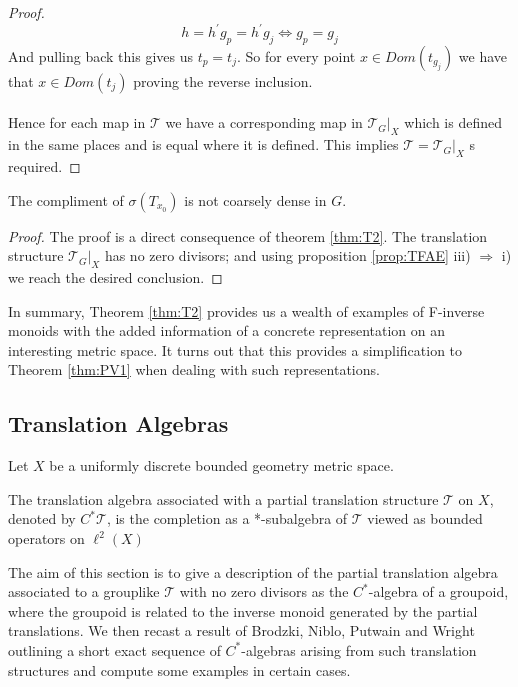 \begin{corollary}
\begin{proof}
\begin{equation}
h=h^{'}g_{p}=h^{'}g_{j} \Leftrightarrow g_{p}=g_{j}
\end{equation}
And pulling back this gives us $t_{p}=t_{j}$. So for every point $x\in Dom(t_{g_{j}})$ we have that $x \in Dom(t_{j})$ proving the reverse inclusion.\\
\\
Hence for each map in $\mathcal{T}$ we have a corresponding map in $\mathcal{T}_{G}|_{X}$ which is defined in the same places and is equal where it is defined. This implies $\mathcal{T}=\mathcal{T}_{G}|_{X}$ s required.
\end{proof}

\begin{corollary}
The compliment of $\sigma (T_{x_{0}})$ is not coarsely dense in $G$.
\end{corollary}
\begin{proof} 
The proof is a direct consequence of theorem \ref{thm:T2}. The translation structure $\mathcal{T}_{G}|_{X}$ has no zero divisors; and using proposition \ref{prop:TFAE} iii) $\Rightarrow$ i) we reach the desired conclusion.
\end{proof}

In summary, Theorem \ref{thm:T2} provides us a wealth of examples of F-inverse monoids with the added information of a concrete representation on an interesting metric space. It turns out that this provides a simplification to Theorem \ref{thm:PV1} when dealing with such representations.

\subsection{Translation Algebras}
Let $X$ be a uniformly discrete bounded geometry metric space.

\begin{definition}
The translation algebra associated with a partial translation structure $\mathcal{T}$ on $X$, denoted by $C^{*}\mathcal{T}$, is the completion as a *-subalgebra of $\mathcal{T}$ viewed as bounded operators on $\ell^{2}(X)$
\end{definition}

The aim of this section is to give a description of the partial translation algebra associated to a grouplike $\mathcal{T}$ with no zero divisors as the $C^{*}$-algebra of a groupoid, where the groupoid is related to the inverse monoid generated by the partial translations. We then recast a result of Brodzki, Niblo, Putwain and Wright \cite[Theorem 8.3]{rosiesthesis} outlining a short exact sequence of $C^{*}$-algebras arising from such translation structures and compute some examples in certain cases.


\end{corollary}
